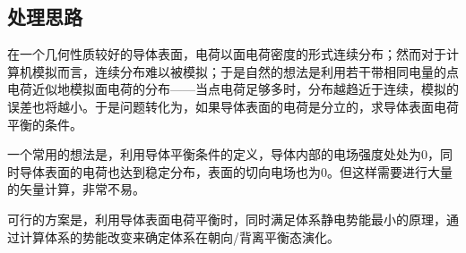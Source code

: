 \documentclass[UTF8]{article}
\numberwithin{figure}{subsection}
\numberwithin{table}{subsection}
\begin{document}
\begin{multicols}{2}
    \subsection{处理思路}
    \par 在一个几何性质较好的导体表面，电荷以面电荷密度的形式连续分布；然而对于计算机模拟而言，连续分布难以被模拟；于是自然的想法是利用若干带相同电量的点电荷近似地模拟面电荷的分布——当点电荷足够多时，分布越趋近于连续，模拟的误差也将越小。于是问题转化为，如果导体表面的电荷是分立的，求导体表面电荷平衡的条件。
    \par 一个常用的想法是，利用导体平衡条件的定义，导体内部的电场强度处处为$0$，同时导体表面的电荷也达到稳定分布，表面的切向电场也为$0$。但这样需要进行大量的矢量计算，非常不易。
    \par 可行的方案是，利用导体表面电荷平衡时，同时满足体系静电势能最小的原理，通过计算体系的势能改变来确定体系在朝向/背离平衡态演化。

\end{multicols}
\end{document}
